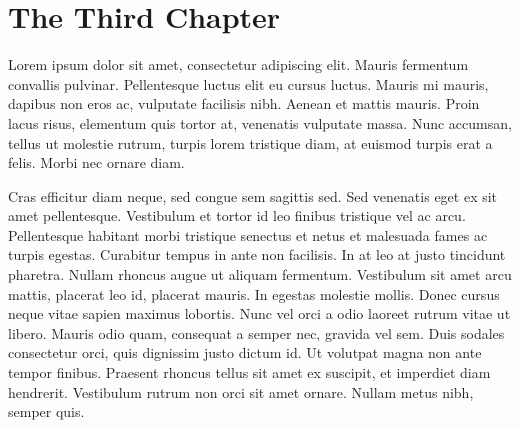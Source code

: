 \chapter{The Third Chapter} \label{ch:3}

Lorem ipsum dolor sit amet, consectetur adipiscing elit. Mauris fermentum convallis pulvinar. Pellentesque luctus elit eu cursus luctus. Mauris mi mauris, dapibus non eros ac, vulputate facilisis nibh. Aenean et mattis mauris. Proin lacus risus, elementum quis tortor at, venenatis vulputate massa. Nunc accumsan, tellus ut molestie rutrum, turpis lorem tristique diam, at euismod turpis erat a felis. Morbi nec ornare diam.

Cras efficitur diam neque, sed congue sem sagittis sed. Sed venenatis eget ex sit amet pellentesque. Vestibulum et tortor id leo finibus tristique vel ac arcu. Pellentesque habitant morbi tristique senectus et netus et malesuada fames ac turpis egestas. Curabitur tempus in ante non facilisis. In at leo at justo tincidunt pharetra. Nullam rhoncus augue ut aliquam fermentum. Vestibulum sit amet arcu mattis, placerat leo id, placerat mauris. In egestas molestie mollis. Donec cursus neque vitae sapien maximus lobortis. Nunc vel orci a odio laoreet rutrum vitae ut libero. Mauris odio quam, consequat a semper nec, gravida vel sem. Duis sodales consectetur orci, quis dignissim justo dictum id. Ut volutpat magna non ante tempor finibus. Praesent rhoncus tellus sit amet ex suscipit, et imperdiet diam hendrerit. Vestibulum rutrum non orci sit amet ornare. Nullam metus nibh, semper quis.

